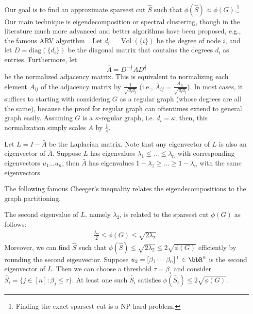 Our goal is to find an approximate sparsest cut $\hat{S}$ such that $\phi(\hat{S}) \approx \phi(G)$.\footnote{Finding the exact sparsest cut is a NP-hard problem.} Our main technique is eigendecomposition or spectral clustering, though in the literature much more advanced and better algorithms have been proposed, e.g., the famous ARV algorithm~\cite{arora2009expander}. Let $d_i = \operatorname{Vol}(\{i\})$ be the degree of node $i$, and let $D = \text{diag}(\{d_i\})$ be the diagonal matrix that contains the degrees $d_i$ as entries. Furthermore, let 
\begin{equation}
    \bar{A} = D^{-\frac{1}{2}} A D^{\frac{1}{2}}
\end{equation}
be the normalized adjacency matrix. This is equivalent to normalizing each element $A_{ij}$ of the adjacency matrix by $\frac{1}{\sqrt{d_i d_j}}$ (i.e., $\bar{A}_{ij} = \frac{A_{ij}}{\sqrt{d_i d_j}}$).
In most cases, it suffices to starting with considering $G$ as a regular graph (whose degrees are all the same), because the proof for regular graph can oftentimes extend to general graph easily. Assuming $G$ is a $\kappa$-regular graph, i.e. $d_i = \kappa$; then, this normalization simply scales $A$ by $\frac{1}{\kappa}$.

 Let $L = I - \bar{A}$ be the Laplacian matrix. Note that any eigenvector of $L$ is also an eigenvector of $\bar{A}$. Suppose $L$ has eigenvalues $\lambda_1 \leq \hdots \leq \lambda_n$ with corresponding eigenvectors $u_1 \hdots u_n$, then $\bar{A}$ has eigenvalues $1 - \lambda_1 \geq \hdots \geq 1 - \lambda_n$ with the same eigenvectors.
 
 The following famous Cheeger's inequality relates the eigendecompositions to the graph partitioning. 

\begin{theorem}
The second eigenvalue of $L$, namely $\lambda_2$, is related to the sparsest cut $\phi(G)$ as follows:
\begin{align}
    \frac{\lambda_2}{2} \leq \phi(G) \leq \sqrt{2 \lambda_2} \;.
\end{align}
Moreover, we can find $\hat{S}$ such that $\phi(\hat{S}) \leq \sqrt{2 \lambda_2} \leq 2 \sqrt{\phi(G)}$ efficiently by rounding the second eigenvector. Suppose $u_2 = [\beta_1 \cdots \beta_n]^\top \in \bbR^n$ is the second eigenvector of $L$. Then we can choose a threshold $\tau = \beta_i$ and consider $\hat{S}_i = \{ j \in [n] : \beta_j \leq \tau \}$. At least one such $\hat{S}_i$ satisfies $\phi(\hat{S}_i) \leq 2 \sqrt{\phi(G)}$.
\end{theorem}

